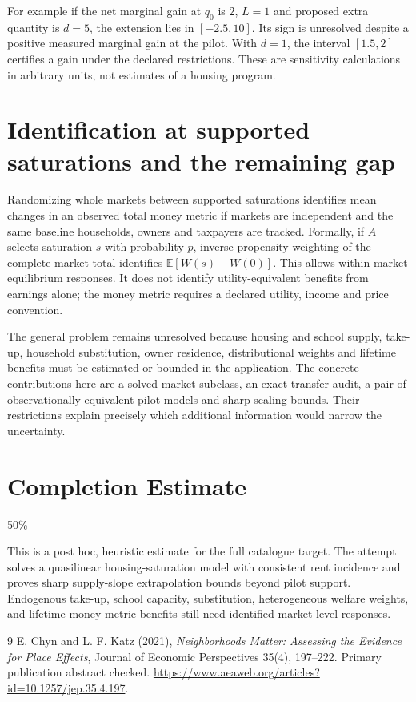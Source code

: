 \documentclass[11pt,a4paper]{article}
\newcommand{\E}{\mathbb E}
\begin{document}
For example if the net marginal gain at $q_0$ is $2$, $L=1$ and proposed extra quantity is $d=5$, the extension lies in $[-2.5,10]$. Its sign is unresolved despite a positive measured marginal gain at the pilot. With $d=1$, the interval $[1.5,2]$ certifies a gain under the declared restrictions. These are sensitivity calculations in arbitrary units, not estimates of a housing program.

\section{Identification at supported saturations and the remaining gap}
Randomizing whole markets between supported saturations identifies mean changes in an observed total money metric if markets are independent and the same baseline households, owners and taxpayers are tracked. Formally, if $A$ selects saturation $s$ with probability $p$, inverse-propensity weighting of the complete market total identifies $\E[W(s)-W(0)]$. This allows within-market equilibrium responses. It does not identify utility-equivalent benefits from earnings alone; the money metric requires a declared utility, income and price convention.

The general problem remains unresolved because housing and school supply, take-up, household substitution, owner residence, distributional weights and lifetime benefits must be estimated or bounded in the application. The concrete contributions here are a solved market subclass, an exact transfer audit, a pair of observationally equivalent pilot models and sharp scaling bounds. Their restrictions explain precisely which additional information would narrow the uncertainty.

\section{Completion Estimate}
50\%

This is a post hoc, heuristic estimate for the full catalogue target.
The attempt solves a quasilinear housing-saturation model with consistent rent incidence and proves sharp supply-slope extrapolation bounds beyond pilot support. Endogenous take-up, school capacity, substitution, heterogeneous welfare weights, and lifetime money-metric benefits still need identified market-level responses.

\begin{thebibliography}{9}
 E. Chyn and L. F. Katz (2021), \emph{Neighborhoods Matter: Assessing the Evidence for Place Effects}, Journal of Economic Perspectives 35(4), 197--222. Primary publication abstract checked. \url{https://www.aeaweb.org/articles?id=10.1257/jep.35.4.197}.
\end{thebibliography}
\end{document}
